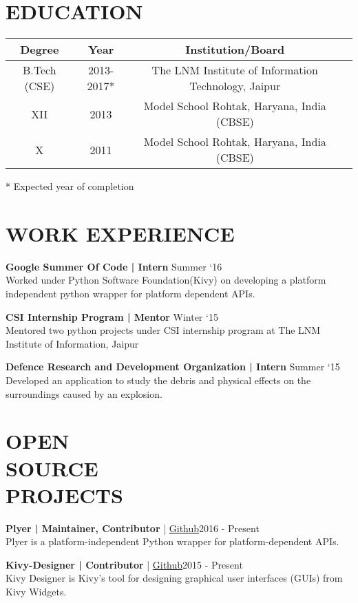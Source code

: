 \documentclass[margin]{res}
\begin{document}
\begin{resume}

\section{EDUCATION}

\begin{tabular}{|c|c|c|c|}

\hline
\textbf{Degree} & \textbf{Year} & {Institution/Board} \\
\hline
B.Tech (CSE) & 2013-2017* & The LNM Institute of Information Technology, Jaipur \\
\hline
XII & 2013 & Model School Rohtak, Haryana, India (CBSE) \\
\hline
X & 2011 & Model School Rohtak, Haryana, India (CBSE) \\
\hline
\end{tabular}
* Expected year of completion

\section{WORK EXPERIENCE}
\textbf{Google Summer Of Code | Intern}
\hfill Summer `16 \\
Worked under Python Software Foundation(Kivy) on developing a platform independent python wrapper for platform dependent APIs.

\textbf{CSI Internship Program | Mentor} \hfill Winter `15 \\
Mentored two python projects under CSI internship program at The LNM Institute of Information, Jaipur

\textbf{Defence Research and Development Organization | Intern} \hfill Summer `15 \\
Developed an application to study the debris and physical effects on the surroundings caused by an explosion.

\section{OPEN \\SOURCE \\ PROJECTS}

    {\textbf{Plyer | Maintainer, Contributor}  | \href{https://github.com/kivy/plyer/pulls/kiok46}{ Github}\hfill 2016 - Present \\
    Plyer is a platform-independent Python wrapper for platform-dependent APIs.

    {\textbf{Kivy-Designer | Contributor}  | \href{https://github.com/kivy/kivy-designer/commits?author=kiok46}{ Github}\hfill 2015 - Present \\
    Kivy Designer is Kivy's tool for designing graphical user interfaces (GUIs) from Kivy Widgets.

}}
\end{resume}
\end{document}
